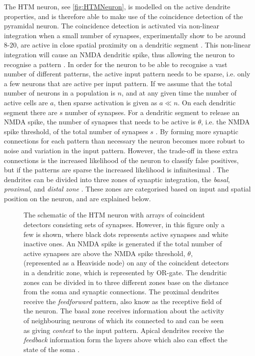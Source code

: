 The HTM neuron, see \autoref{fig:HTMNeuron}, is modelled on the active dendrite properties, and is therefore able to make use of the coincidence detection of the pyramidal neuron. The coincidence detection is activated via non-linear integration when a small number of synapses, experimentally show to be around 8-20, are active in close spatial proximity on a dendritic segment \cite{10.3389/fncir.2016.00023}. This non-linear integration will cause an NMDA dendritic spike, thus allowing the neuron to recognise a pattern \cite{10.3389/fncir.2016.00023}. In order for the neuron to be able to recognise a vast number of different patterns, the active input pattern needs to be sparse, i.e. only a few neurons that are active per input pattern. If we assume that the total number of neurons in a population is $n$, and at any given time the number of active cells are $a$, then sparse activation is given as $a \ll n$. On each dendritic segment there are $s$ number of synapses. For a dendritic segment to release an NMDA spike, the number of synapses that needs to be active is $\theta$, i.e. the NMDA spike threshold, of the total number of synapses $s$ \cite{10.3389/fncir.2016.00023}. By forming more synaptic connections for each pattern than necessary the neuron becomes more robust to noise and variation in the input pattern. However, the trade-off in these extra connections is the increased likelihood of the neuron to classify false positives, but if the patterns are sparse the increased likelihood is infinitesimal \cite{10.3389/fncir.2016.00023}. The dendrites can be divided into three zones of synaptic integration, the \textit{basal}, \textit{proximal}, and \textit{distal zone} \cite{10.3389/fncir.2016.00023}. These zones are categorised based on input and spatial position on the neuron, and are explained below.

\begin{figure}[ht!]
    \centering
    \hbox{\hspace{3.5em}}
    \caption{The schematic of the HTM neuron with arrays of coincident detectors consisting sets of synapses. However, in this figure only a few is shown, where black dots represents active synapses and white inactive ones. An NMDA spike is generated if the total number of active synapses are above the NMDA spike threshold, $\theta$, (represented as a Heaviside node) on any of the coincident detectors in a dendritic zone, which is represented by OR-gate. The dendritic zones can be divided in to three different zones base on the distance from the soma and synaptic connections. The proximal dendrites receive the \textit{feedforward} pattern, also know as the receptive field of the neuron. The basal zone receives information about the activity of neighbouring neurons of which its connected to and can be seen as giving \textit{context} to the input pattern. Apical dendrites receive the \textit{feedback} information form the layers above which also can effect the state of the soma \cite{10.3389/fncir.2016.00023}.}
    \label{fig:HTMNeuron}
\end{figure}



